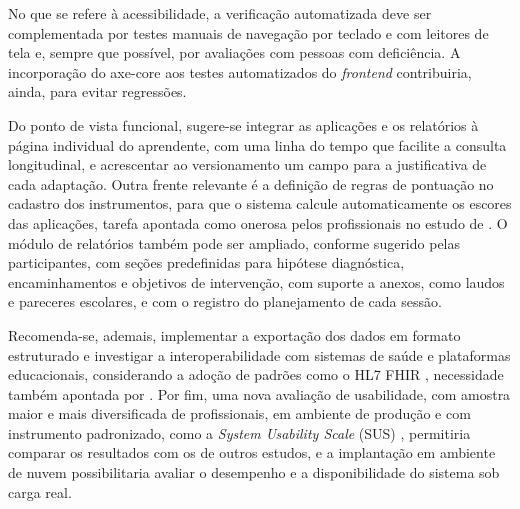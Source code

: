 No que se refere à acessibilidade, a verificação automatizada deve ser complementada por testes manuais de navegação por teclado e com leitores de tela e, sempre que possível, por avaliações com pessoas com deficiência. A incorporação do axe-core aos testes automatizados do \textit{frontend} contribuiria, ainda, para evitar regressões.

Do ponto de vista funcional, sugere-se integrar as aplicações e os relatórios à página individual do aprendente, com uma linha do tempo que facilite a consulta longitudinal, e acrescentar ao versionamento um campo para a justificativa de cada adaptação. Outra frente relevante é a definição de regras de pontuação no cadastro dos instrumentos, para que o sistema calcule automaticamente os escores das aplicações, tarefa apontada como onerosa pelos profissionais no estudo de . O módulo de relatórios também pode ser ampliado, conforme sugerido pelas participantes, com seções predefinidas para hipótese diagnóstica, encaminhamentos e objetivos de intervenção, com suporte a anexos, como laudos e pareceres escolares, e com o registro do planejamento de cada sessão.

Recomenda-se, ademais, implementar a exportação dos dados em formato estruturado e investigar a interoperabilidade com sistemas de saúde e plataformas educacionais, considerando a adoção de padrões como o HL7 FHIR \cite{Lins_Ferreira_Nutels_Junior_Tenorio_Filho_2024}, necessidade também apontada por . Por fim, uma nova avaliação de usabilidade, com amostra maior e mais diversificada de profissionais, em ambiente de produção e com instrumento padronizado, como a \textit{System Usability Scale} (SUS) \cite{brooke1996_sus}, permitiria comparar os resultados com os de outros estudos, e a implantação em ambiente de nuvem possibilitaria avaliar o desempenho e a disponibilidade do sistema sob carga real.